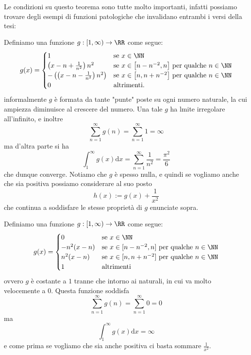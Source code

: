 \documentclass[11pt]{scrartcl}
\newcommand{\dif}{\text{d}}
\begin{document}
	Le condizioni su questo teorema sono tutte molto importanti, infatti possiamo trovare degli esempi di funzioni patologiche che invalidano entrambi i versi della tesi:
	\begin{example}
		Definiamo una funzione $g:[1,\infty)\to\RR$ come segue:
		$$g(x)=\begin{cases}
			1 & \text{se $x\in \NN$} \\
			\left(x-n+\frac{1}{n^2}\right)n^2 & \text{se $x\in \left[n-n^{-2},n\right]$ per qualche $n\in \NN$} \\
			-\left(\left(x-n-\frac{1}{n^2}\right)n^2\right) & \text{se $x\in \left[n,n+n^{-2}\right]$ per qualche $n\in \NN$} \\ 
			0 & \text{altrimenti.}
		\end{cases}$$
		informalmente $g$ è formata da tante "punte" poste su ogni numero naturale, la cui ampiezza diminuisce al crescere del numero. Una tale $g$ ha lmite irregolare all'infinito, e inoltre
		$$\sum_{n=1}^{\infty}g(n)=\sum_{n=1}^{\infty}1=\infty$$
		ma d'altra parte si ha
		$$\int_1^\infty g(x)\dif x= \sum_{n=1}^{\infty}\frac{1}{n^2}=\frac{\pi^2}{6}$$
		che dunque converge. Notiamo che $g$ è spesso nulla, e quindi se vogliamo anche che sia positiva possiamo considerare al suo posto
		$$h(x):=g(x)+\frac{1}{x^2}$$
		che continua a soddisfare le stesse proprietà di $g$ enunciate sopra.
	\end{example}
	\begin{example}
		Definiamo una funzione $g:[1,\infty)\to\RR$ come segue:
		$$g(x)=
		\begin{cases}
			0 & \text{se $x\in\NN$} \\
			-n^2(x-n) & \text{se $x\in [n-n^{-2},n]$ per qualche $n\in\NN$} \\
			n^2(x-n) & \text{se $x\in [n,n+n^{-2}]$ per qualche $n\in\NN$} \\
			1 & \text{altrimenti}
		\end{cases}
		$$
		ovvero $g$ è costante a $1$ tranne che intorno ai naturali, in cui va molto velocemente a $0$. Questa funzione soddisfa
		$$\sum_{n=1}^{\infty}g(n)=\sum_{n=1}^{\infty}0=0$$
		ma
		$$\int_1^\infty g(x)\dif x=\infty$$
		e come prima se vogliamo che sia anche positiva ci basta sommare $\frac{1}{x^2}$.
	\end{example}
	\newpage
	
\end{document}
